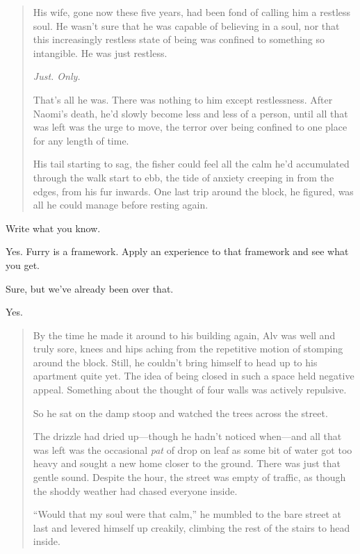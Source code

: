 \begin{paracol}{2}
\begin{leftcolumn}
\begin{quotation}
  His wife, gone now these five years, had been fond of calling him a restless soul. He wasn't sure that he was capable of believing in a soul, nor that this increasingly restless state of being was confined to something so intangible. He was just restless.

  \emph{Just. Only.}

  That's all he was. There was nothing to him except restlessness. After Naomi's death, he'd slowly become less and less of a person, until all that was left was the urge to move, the terror over being confined to one place for any length of time.

  His tail starting to sag, the fisher could feel all the calm he'd accumulated through the walk start to ebb, the tide of anxiety creeping in from the edges, from his fur inwards. One last trip around the block, he figured, was all he could manage before resting again.
\end{quotation}

\begin{ally}
Write what you know.
\end{ally}
Yes. Furry is a framework. Apply an experience to that framework and see what you get.

\begin{ally}
Sure, but we've already been over that.
\end{ally}
Yes.

\begin{quotation}
  \noindent By the time he made it around to his building again, Alv was well and truly sore, knees and hips aching from the repetitive motion of stomping around the block. Still, he couldn't bring himself to head up to his apartment quite yet. The idea of being closed in such a space held negative appeal. Something about the thought of four walls was actively repulsive.

  So he sat on the damp stoop and watched the trees across the street.

  The drizzle had dried up---though he hadn't noticed when---and all that was left was the occasional \emph{pat} of drop on leaf as some bit of water got too heavy and sought a new home closer to the ground. There was just that gentle sound. Despite the hour, the street was empty of traffic, as though the shoddy weather had chased everyone inside.

  ``Would that my soul were that calm,'' he mumbled to the bare street at last and levered himself up creakily, climbing the rest of the stairs to head inside.
\end{quotation}


\end{leftcolumn}
\end{paracol}
